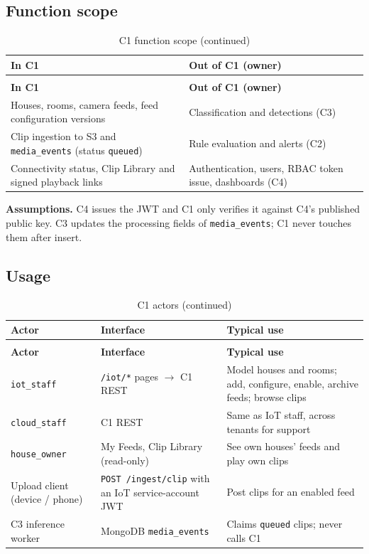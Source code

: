 \subsection{Function scope}
\begin{longtable}{L{6.4cm}L{8.4cm}}
\caption{C1 function scope}\label{tab:c1-scope}\\
\toprule
\textbf{In C1} & \textbf{Out of C1 (owner)} \\
\midrule
\endfirsthead
\caption[]{C1 function scope (continued)}\\
\toprule
\textbf{In C1} & \textbf{Out of C1 (owner)} \\
\midrule
\endhead
Houses, rooms, camera feeds, feed configuration versions & Classification and detections (C3) \\
Clip ingestion to S3 and \texttt{media\_events} (status \texttt{queued}) & Rule evaluation and alerts (C2) \\
Connectivity status, Clip Library and signed playback links & Authentication, users, RBAC token issue, dashboards (C4) \\
\bottomrule
\end{longtable}
\textbf{Assumptions.} C4 issues the JWT and C1 only verifies it against C4's published public key.
C3 updates the processing fields of \texttt{media\_events}; C1 never touches them after insert.

\subsection{Usage}
\begin{longtable}{L{3.0cm}L{4.0cm}L{7.8cm}}
\caption{C1 actors}\label{tab:c1-actors}\\
\toprule
\textbf{Actor} & \textbf{Interface} & \textbf{Typical use} \\
\midrule
\endfirsthead
\caption[]{C1 actors (continued)}\\
\toprule
\textbf{Actor} & \textbf{Interface} & \textbf{Typical use} \\
\midrule
\endhead
\texttt{iot\_staff} & \texttt{/iot/*} pages $\rightarrow$ C1 REST & Model houses and rooms; add, configure, enable, archive feeds; browse clips \\
\texttt{cloud\_staff} & C1 REST & Same as IoT staff, across tenants for support \\
\texttt{house\_owner} & My Feeds, Clip Library (read-only) & See own houses' feeds and play own clips \\
Upload client (device / phone) & \texttt{POST /ingest/clip} with an IoT service-account JWT & Post clips for an enabled feed \\
C3 inference worker & MongoDB \texttt{media\_events} & Claims \texttt{queued} clips; never calls C1 \\
\bottomrule
\end{longtable}

